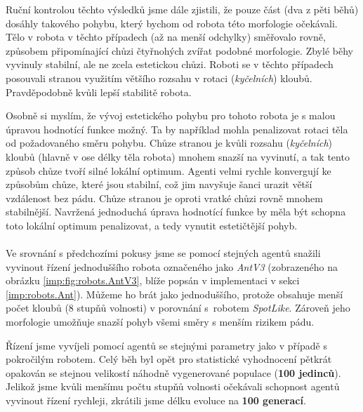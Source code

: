 Ruční kontrolou těchto výsledků jsme dále zjistili, že pouze část (dva z pěti
běhů) dosáhly takového pohybu, který bychom od robota této morfologie
očekávali. Tělo v robota v těchto případech (až na menší odchylky) směřovalo
rovně, způsobem připomínající chůzi čtyřnohých zvířat podobné morfologie. Zbylé
běhy vyvinuly stabilní, ale ne zcela estetickou chůzi. Roboti se v těchto
případech posouvali stranou využitím většího rozsahu v rotaci
(\emph{kyčelních}) kloubů. Pravděpodobně kvůli lepší stabilitě robota.

Osobně si myslím, že vývoj estetického pohybu pro tohoto robota je s malou
úpravou hodnotící funkce možný. Ta by například mohla penalizovat rotaci těla
od požadovaného směru pohybu. Chůze stranou je kvůli rozsahu (\emph{kyčelních})
kloubů (hlavně v ose délky těla robota) mnohem snazší na vyvinutí, a tak tento
způsob chůze tvoří silné lokální optimum. Agenti velmi rychle konvergují ke
způsobům chůze, které jsou stabilní, což jim navyšuje šanci urazit větší
vzdálenost bez pádu. Chůze stranou je oproti vratké chůzi rovně mnohem
stabilnější. Navržená jednoduchá úprava hodnotící funkce by měla být schopna
toto lokální optimum penalizovat, a tedy vynutit estetičtější pohyb.

\paragraph{}
Ve srovnání s předchozími pokusy jsme se pomocí stejných agentů snažili
vyvinout řízení jednoduššího robota označeného jako \emph{AntV3} (zobrazeného na
obrázku \ref{imp:fig:robots.AntV3}, blíže popsán v implementaci v sekci
\ref{imp:robots.Ant}). Můžeme ho brát jako jednoduššího, protože obsahuje menší
počet kloubů (8 stupňů volnosti) v porovnání s~robotem \emph{SpotLike}. Zároveň
jeho morfologie umožňuje snazší pohyb všemi směry s menším rizikem pádu.

Řízení jsme vyvíjeli pomocí agentů se stejnými parametry jako v případě s
pokročilým robotem. Celý běh byl opět pro statistické vyhodnocení pětkrát
opakován se stejnou velikostí náhodně vygenerované populace (\textbf{100
jedinců}). Jelikož jsme kvůli menšímu počtu stupňů volnosti očekávali schopnost
agentů vyvinout řízení rychleji, zkrátili jsme délku evoluce na \textbf{100
generací}.

